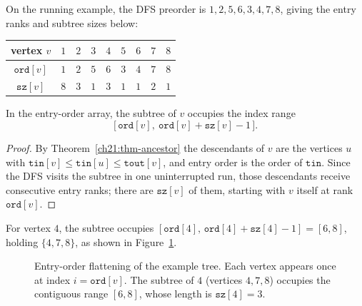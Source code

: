 On the running example, the DFS preorder is $1,2,5,6,3,4,7,8$, giving the entry ranks and subtree sizes below:

\begin{center}
\begin{tabular}{c|cccccccc}
\toprule
vertex $v$ & $1$ & $2$ & $3$ & $4$ & $5$ & $6$ & $7$ & $8$\\
\midrule
$\texttt{ord}[v]$ & $1$ & $2$ & $5$ & $6$ & $3$ & $4$ & $7$ & $8$\\
$\texttt{sz}[v]$  & $8$ & $3$ & $1$ & $3$ & $1$ & $1$ & $2$ & $1$\\
\bottomrule
\end{tabular}
\end{center}

\begin{corollary}
\label{ch21:cor-range}
In the entry-order array, the subtree of $v$ occupies the index range
\[
\bigl[\,\texttt{ord}[v],\ \texttt{ord}[v]+\texttt{sz}[v]-1\,\bigr].
\]
\end{corollary}

\begin{proof}
By Theorem~\ref{ch21:thm-ancestor} the descendants of $v$ are the vertices
$u$ with $\texttt{tin}[v]\le\texttt{tin}[u]\le\texttt{tout}[v]$, and entry order is
the order of $\texttt{tin}$. Since the DFS visits the subtree in one uninterrupted run, those
descendants receive consecutive entry ranks; there are $\texttt{sz}[v]$ of them, starting with $v$ itself at rank $\texttt{ord}[v]$.
\end{proof}

For vertex $4$, the subtree occupies $[\texttt{ord}[4],\,
\texttt{ord}[4]+\texttt{sz}[4]-1]=[6,8]$, holding $\{4,7,8\}$, as shown in Figure~\ref{ch21:fig-entry-order}.

\begin{figure}[htbp]
\centering
{}
\caption{Entry-order flattening of the example tree. Each vertex appears once at index $i=\texttt{ord}[v]$. The subtree of $4$ (vertices $4,7,8$) occupies the contiguous range $[6,8]$, whose length is $\texttt{sz}[4]=3$.}
\label{ch21:fig-entry-order}
\end{figure}

